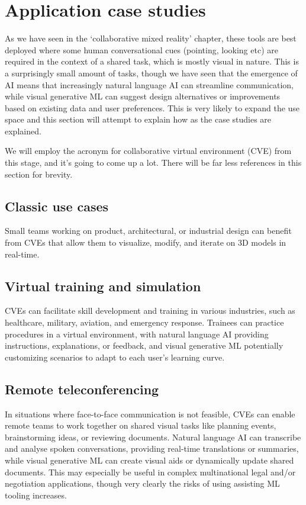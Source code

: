 \section{Application case studies}
As we have seen in the `collaborative mixed reality' chapter, these tools are best deployed where some human conversational cues (pointing, looking etc) are required in the context of a shared task, which is mostly visual in nature. This is a surprisingly small amount of tasks, though we have seen that the emergence of AI means that increasingly natural language AI can streamline communication, while visual generative ML can suggest design alternatives or improvements based on existing data and user preferences. This is very likely to expand the use space and this section will attempt to explain how as the case studies are explained.\par 
We will employ the acronym for collaborative virtual environment (CVE) from this stage, and it's going to come up a lot. There will be far less references in this section for brevity.
\subsection{Classic use cases}
Small teams working on product, architectural, or industrial design can benefit from CVEs that allow them to visualize, modify, and iterate on 3D models in real-time. 
\subsection{Virtual training and simulation}
CVEs can facilitate skill development and training in various industries, such as healthcare, military, aviation, and emergency response. Trainees can practice procedures in a virtual environment, with natural language AI providing instructions, explanations, or feedback, and visual generative ML potentially customizing scenarios to adapt to each user's learning curve.
\subsection{Remote teleconferencing}
In situations where face-to-face communication is not feasible, CVEs can enable remote teams to work together on shared visual tasks like planning events, brainstorming ideas, or reviewing documents. Natural language AI can transcribe and analyse spoken conversations, providing real-time translations or summaries, while visual generative ML can create visual aids or dynamically update shared documents. This may especially be useful in complex multinational legal and/or negotiation applications, though very clearly the risks of using assisting ML tooling increases. 
